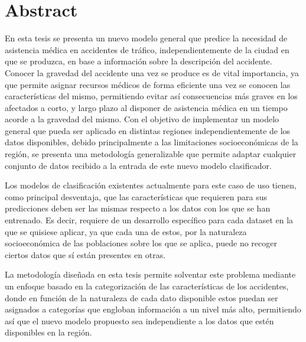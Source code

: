 \chapter*{Abstract}






En esta tesis se presenta un nuevo modelo general que predice la necesidad de asistencia médica en accidentes de tráfico, independientemente de la ciudad en que se produzca, en base a información sobre la descripción del accidente. Conocer la gravedad del accidente una vez se produce es de vital importancia, ya que permite asignar recursos médicos de forma eficiente una vez se conocen las características del mismo, permitiendo evitar así consecuencias más graves en los afectados a corto, y largo plazo al disponer de asistencia médica en un tiempo acorde a la gravedad del mismo. Con el objetivo de implementar un modelo general que pueda ser aplicado en distintas regiones independientemente de los datos disponibles, debido principalmente a las limitaciones socioeconómicas de la región, se presenta una metodología generalizable que permite adaptar cualquier conjunto de datos recibido a la entrada de este nuevo modelo clasificador.

Los modelos de clasificación existentes actualmente para este caso de uso tienen, como principal desventaja, que las características que requieren para sus predicciones deben ser las mismas respecto a los datos con los que se han entrenado. Es decir, requiere de un desarrollo específico para cada dataset en la que se quisiese aplicar, ya que cada una de estos, por la naturaleza socioeconómica de las poblaciones sobre los que se aplica, puede no recoger ciertos datos que sí están presentes en otras. 

La metodología diseñada en esta tesis permite solventar este problema mediante un enfoque basado en la categorización de las características de los accidentes, donde en función de la naturaleza de cada dato disponible estos puedan ser asignados a categorías que engloban información a un nivel más alto, permitiendo así que el nuevo modelo propuesto sea independiente a los datos que estén disponibles en la región.

